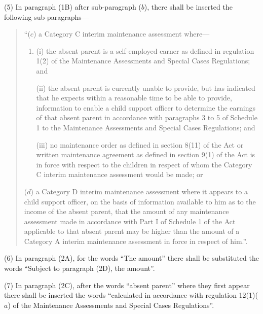 \documentclass[a4paper]{article}
\begin{document}
(5) In paragraph (1B) after sub-paragraph ($b$), there shall be inserted the following sub-paragraphs—
\begin{quotation}
“($c$) a Category C interim maintenance assessment where—
\begin{enumerate}\item[]
(i) the absent parent is a self-employed earner as defined in regulation 1(2) of the Maintenance Assessments and Special Cases Regulations; and

(ii) the absent parent is currently unable to provide, but has indicated that he expects within a reasonable time to be able to provide, information to enable a child support officer to determine the earnings of that absent parent in accordance with paragraphs 3 to 5 of Schedule 1 to the Maintenance Assessments and Special Cases Regulations; and

(iii) no maintenance order as defined in section 8(11) of the Act or written maintenance agreement as defined in section 9(1) of the Act is in force with respect to the children in respect of whom the Category C interim maintenance assessment would be made; or
\end{enumerate}

($d$) a Category D interim maintenance assessment where it appears to a child support officer, on the basis of information available to him as to the income of the absent parent, that the amount of any maintenance assessment made in accordance with Part I of Schedule 1 of the Act applicable to that absent parent may be higher than the amount of a Category A interim maintenance assessment in force in respect of him.”.
\end{quotation}

(6) In paragraph (2A), for the words “The amount” there shall be substituted the words “Subject to paragraph (2D), the amount”.

(7) In paragraph (2C), after the words “absent parent” where they first appear there shall be inserted the words “calculated in accordance with regulation 12(1)($a$) of the Maintenance Assessments and Special Cases Regulations”.
\end{document}
